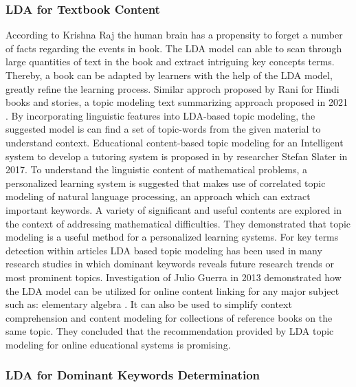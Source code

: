 \documentclass[sn-mathphys,Numbered]{sn-jnl}%
\theoremstyle{thmstyleone}%
\theoremstyle{thmstyletwo}%
\theoremstyle{thmstylethree}%
\begin{document}
\subsubsection{LDA for Textbook Content}

According to Krishna Raj \cite{raj_p_m_sentiment_2022} the human brain has a propensity to forget a number of facts regarding the events in book. The LDA model can able to scan through large quantities of text in the book and extract intriguing key concepts terms. Thereby, a book can be adapted by learners with the help of the LDA model, greatly refine the learning process. Similar approch proposed by  Rani for Hindi books and stories, a topic modeling text summarizing approach proposed in 2021 \cite{rani_extractive_2021}. By incorporating linguistic features into LDA-based topic modeling, the suggested model is can find a set of topic-words from the given material to understand context.  Educational content-based topic modeling for an Intelligent system to develop a tutoring system is proposed in \cite{slater_using_2017} by researcher Stefan Slater in 2017. To understand the linguistic content of mathematical problems, a personalized learning system is suggested that makes use of correlated topic modeling of natural language processing, an approach which can extract important keywords. A variety of significant and useful contents are explored in the context of addressing mathematical difficulties. They demonstrated that topic modeling is a useful method for a personalized learning systems. For key terms detection within articles LDA based topic modeling has been used in many research studies in which dominant keywords reveals future research trends or most prominent topics. Investigation of Julio Guerra in 2013 demonstrated how the LDA model can be utilized for online content linking for any major subject such as: elementary algebra \cite{guerra_when_2013}. It can also be used to simplify context comprehension and content modeling for collections of reference books on the same topic. They concluded that the recommendation provided by LDA topic modeling for online educational systems is promising.

\subsubsection{LDA for Dominant Keywords Determination}
\end{document}
